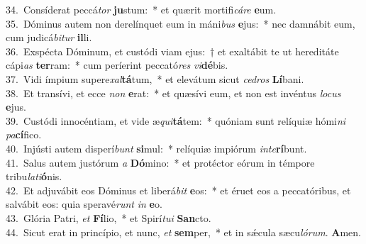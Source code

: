 {34.~}Consíderat peccá\textit{tor} \textbf{ju}stum:~* et quærit mortifi\textit{cá}\textit{re} \textbf{e}um.\\
{35.~}Dóminus autem non derelínquet eum in máni\textit{bus} \textbf{e}jus:~* nec damnábit eum, cum judicá\textit{bi}\textit{tur} \textbf{il}li.\\
{36.~}Exspécta Dóminum, et custódi viam ejus:~† et exaltábit te ut hereditáte cápi\textit{as} \textbf{ter}ram:~* cum períerint peccató\textit{res} \textit{vi}\textbf{dé}bis.\\
{37.~}Vidi ímpium supere\textit{xal}\textbf{tá}tum,~* et elevátum sicut \textit{ce}\textit{dros} \textbf{Lí}bani.\\
{38.~}Et transívi, et ecce \textit{non} \textbf{e}rat:~* et quæsívi eum, et non est invéntus \textit{lo}\textit{cus} \textbf{e}jus.\\
{39.~}Custódi innocéntiam, et vide æ\textit{qui}\textbf{tá}tem:~* quóniam sunt relíquiæ hómi\textit{ni} \textit{pa}\textbf{cí}fico.\\
{40.~}Injústi autem disperí\textit{bunt} \textbf{si}mul:~* relíquiæ impiórum \textit{in}\textit{te}\textbf{rí}bunt.\\
{41.~}Salus autem justórum \textit{a} \textbf{Dó}mino:~* et protéctor eórum in témpore tribu\textit{la}\textit{ti}\textbf{ó}nis.\\
{42.~}Et adjuvábit eos Dóminus et liberá\textit{bit} \textbf{e}os:~* et éruet eos a peccatóribus, et salvábit eos: quia speravé\textit{runt} \textit{in} \textbf{e}o.\\
{43.~}Glória Patri, \textit{et} \textbf{Fí}lio,~* et Spirí\textit{tu}\textit{i} \textbf{San}cto.\\
{44.~}Sicut erat in princípio, et nunc, \textit{et} \textbf{sem}per,~* et in sǽcula sæcu\textit{ló}\textit{rum}. \textbf{A}men.\\
